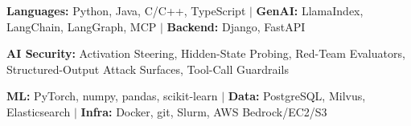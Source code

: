 \item\small{\textbf{Languages:} Python, Java, C/C++, TypeScript $|$ \textbf{GenAI:} LlamaIndex, LangChain, LangGraph, MCP $|$ \textbf{Backend:} Django, FastAPI}
\item\small{\textbf{AI Security:} Activation Steering, Hidden-State Probing, Red-Team Evaluators, Structured-Output Attack Surfaces, Tool-Call Guardrails}
\item\small{\textbf{ML:} PyTorch, numpy, pandas, scikit-learn $|$ \textbf{Data:} PostgreSQL, Milvus, Elasticsearch $|$ \textbf{Infra:} Docker, git, Slurm, AWS Bedrock/EC2/S3}%

